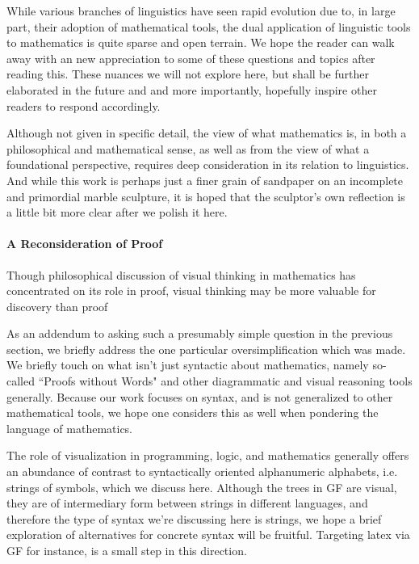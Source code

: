 While various branches of linguistics have seen rapid evolution due to, in large
part, their adoption of mathematical tools, the dual application of linguistic
tools to mathematics is quite sparse and open terrain. We hope the reader can
walk away with an new appreciation to some of these questions and topics after
reading this. These nuances we will not explore here, but shall be further
elaborated in the future and and more importantly, hopefully inspire other
readers to respond accordingly.

Although not given in specific detail, the view of what mathematics is, in both
a philosophical and mathematical sense, as well as from the view of what a
foundational perspective, requires deep consideration in its relation to
linguistics. And while this work is perhaps just a finer grain of sandpaper on
an incomplete and primordial marble sculpture, it is hoped that the sculptor's
own reflection is a little bit more clear after we polish it here.

\paragraph{A Reconsideration of Proof}

\begin{displayquote}
Though philosophical discussion of visual thinking in mathematics has
concentrated on its role in proof, visual thinking may be more valuable for
discovery than proof \cite{sep-epistemology-visual-thinking}
\end{displayquote}

As an addendum to asking such a presumably simple question in the previous
section, we briefly address the one particular oversimplification which was
made. We briefly touch on what isn't just syntactic about mathematics, namely
so-called ``Proofs without Words" \cite{proofWW} and other diagrammatic and visual
reasoning tools generally. Because our work focuses on syntax, and is not
generalized to other mathematical tools, we hope one considers this as well when
pondering the language of mathematics.

The role of visualization in programming, logic, and mathematics generally offers
an abundance of contrast to syntactically oriented alphanumeric alphabets, i.e.
strings of symbols, which we discuss here. Although the trees in GF are visual,
they are of intermediary form between strings in different languages, and
therefore the type of syntax we're discussing here is strings, we hope a brief
exploration of alternatives for concrete syntax will be fruitful. Targeting
latex via GF for instance, is a small step in this direction.

